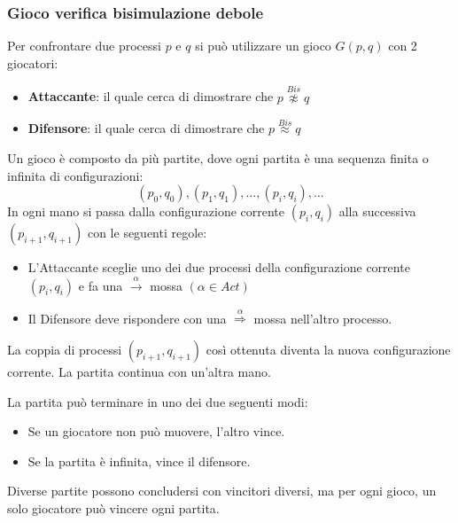 \subsubsection{Gioco verifica bisimulazione debole}
Per confrontare due processi $p$ e $q$ si può utilizzare un gioco $G(p, q)$ con
2 giocatori:
\begin{itemize}
    \item \textbf{Attaccante}: il quale cerca di dimostrare che $p \stackrel{Bis}{\not\approx} q$
    \item \textbf{Difensore}: il quale cerca di dimostrare che $p \stackrel{Bis}{\approx} q$
\end{itemize}
Un gioco è composto da più partite, dove ogni partita è una sequenza finita o
infinita di configurazioni: $$(p_0, q_0), (p_1, q_1), \dots, (p_i, q_i), \dots$$
In ogni mano si passa dalla configurazione corrente $(p_i, q_i)$ alla successiva
$(p_{i + 1}, q_{i + 1})$ con le seguenti regole:
\begin{itemize}
    \item L'Attaccante sceglie uno dei due processi della configurazione corrente
          $(p_i, q_i)$ e fa una $\xrightarrow{\alpha}$ mossa $(\alpha \in Act)$
    \item Il Difensore deve rispondere con una $\stackrel{\alpha}{\Rightarrow}$
          mossa nell'altro processo.
\end{itemize}
La coppia di processi $(p_{i+1}, q_{i+1})$ così ottenuta diventa la nuova
configurazione corrente. La partita continua con un'altra mano.

La partita può terminare in uno dei due seguenti modi:
\begin{itemize}
    \item Se un giocatore non può muovere, l'altro vince.
    \item Se la partita è infinita, vince il difensore.
\end{itemize}
Diverse partite possono concludersi con vincitori diversi, ma per ogni gioco, un
solo giocatore può vincere ogni partita.

